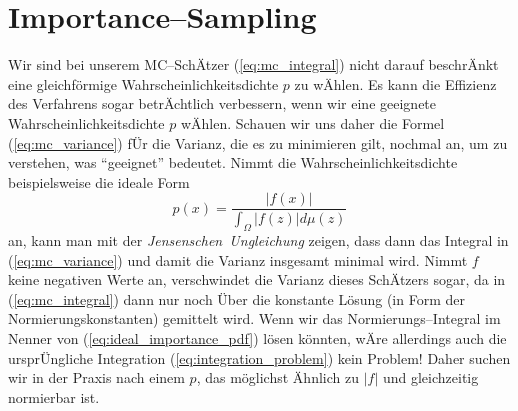 	\section{Importance--Sampling}\label{subsec:importancesampling}
	Wir sind bei unserem MC--SchÄtzer (\ref{eq:mc_integral}) nicht darauf beschrÄnkt eine gleich\-för\-mi\-ge Wahrscheinlichkeitsdichte $p$ zu wÄhlen. Es kann die Effizienz des Verfahrens sogar betrÄchtlich verbessern, wenn wir eine geeignete Wahrscheinlichkeitsdichte $p$ wÄhlen. Schauen wir uns daher die Formel (\ref{eq:mc_variance}) fÜr die Varianz, die es zu minimieren gilt, nochmal an, um zu verstehen, was ``geeignet'' bedeutet. Nimmt die Wahrscheinlichkeitsdichte beispielsweise die ideale Form
	\begin{equation}
		p(x)=\frac{|f(x)|}{\int_\Omega |f(z)|d\mu(z)}
		\label{eq:ideal_importance_pdf}
	\end{equation}
	an, kann man mit der {\em Jensenschen~Ungleichung} zeigen, dass dann das Integral in (\ref{eq:mc_variance}) und damit die Varianz insgesamt minimal wird. Nimmt $f$ keine negativen Werte an, verschwindet die Varianz dieses SchÄtzers sogar, da in (\ref{eq:mc_integral}) dann nur noch Über die konstante Lösung (in Form der Normierungskonstanten) gemittelt wird. Wenn wir das Normierungs--Integral im Nenner von (\ref{eq:ideal_importance_pdf}) lösen könnten, wÄre allerdings auch die ursprÜngliche Integration (\ref{eq:integration_problem}) kein Problem! Daher suchen wir in der Praxis nach einem $p$, das möglichst Ähnlich zu $|f|$ und gleichzeitig normierbar ist.
	
